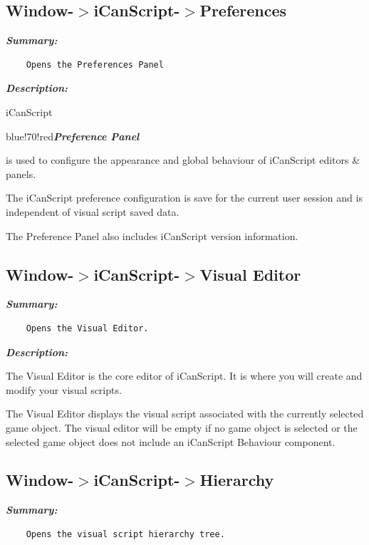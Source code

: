 \subsection{Window-$>$iCanScript-$>$Preferences}
\label{window-icanscript-preferences}

\emph{\textbf{Summary:}}

\begin{verbatim}
    Opens the Preferences Panel
\end{verbatim}

\emph{\textbf{Description:}}

iCanScript \begin{color}{blue!70!red}\emph{\textbf{Preference Panel}}\end{color} is used to configure the appearance and global behaviour of iCanScript editors \& panels.

The iCanScript preference configuration is save for the current user session and is independent of visual script saved data.

The Preference Panel also includes iCanScript version information.

\subsection{Window-$>$iCanScript-$>$Visual Editor}
\label{window-icanscript-visualeditor}

\emph{\textbf{Summary:}}

\begin{verbatim}
    Opens the Visual Editor.
\end{verbatim}

\emph{\textbf{Description:}}

The Visual Editor is the core editor of iCanScript. It is where you will create and modify your visual scripts.

The Visual Editor displays the visual script associated with the currently selected game object. The visual editor will be empty if no game object is selected or the selected game object does not include an iCanScript Behaviour component.

\subsection{Window-$>$iCanScript-$>$Hierarchy}
\label{window-icanscript-hierarchy}

\emph{\textbf{Summary:}}

\begin{verbatim}
    Opens the visual script hierarchy tree.
\end{verbatim}

